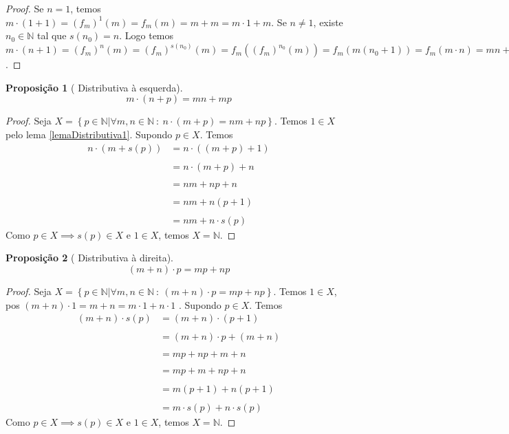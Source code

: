 \documentclass{article}
\theoremstyle{plain}
\newtheorem{prop}{Proposição}[section]
\theoremstyle{definition}
\theoremstyle{remark}
\begin{document}
\begin{proof}
	\label{lemaDistributiva1}
	Se $n = 1$, temos  $m\cdot(1+1) = (f_m)^1(m) = f_m(m) = m+m = m\cdot 1 +m$. Se $n\neq 1$, existe $n_0\in \mathbb{N}$ tal que $s(n_0) = n$. Logo temos $m\cdot( n +1) = (f_m)^{n}(m) = (f_m)^{s(n_0)}(m) =   f_m( (f_m)^{n_0} (m)) = f_m( m(n_0+1)) = f_m(m \cdot n ) =  mn+m$.
\end{proof}
\begin{prop}[ Distributiva à esquerda]
	$$m\cdot(n+p) = mn +mp$$
\end{prop}
\begin{proof}
	Seja $X = \left\{p \in \mathbb{N} | \forall m,n \in \mathbb{N} \: : \:  n\cdot(m+p) = nm + np\right\}$. Temos $1\in X$ pelo lema \ref{lemaDistributiva1}. Supondo $p\in X$. Temos \begin{align*}
		n\cdot(m+s(p)) &= n\cdot ((m+p)+1)  \\~\\
		&= n\cdot(m+p) + n\\~\\
		&= nm+np+n\\~\\
		&=nm+n(p+1)\\~\\
		&=nm+n\cdot s(p)
	\end{align*}
	Como $p\in X\implies s(p) \in X $ e $1\in X$, temos $X = \mathbb{N}$.
\end{proof}
\begin{prop}[ Distributiva à direita]
	$$(m+n)\cdot p = mp +np$$
\end{prop}
\begin{proof}
	Seja $X = \left\{p \in \mathbb{N} | \forall m,n \in \mathbb{N} \: : \:  (m+n)\cdot p = mp + np\right\}$. Temos $1\in X$, pos $(m+n)\cdot 1 = m+n = m\cdot 1 + n \cdot 1$ . Supondo $p\in X$. Temos \begin{align*}
		(m+n)\cdot s(p) &= (m+n)\cdot(p+1)  \\~\\
		&= (m+n)\cdot p + (m+n)\\~\\
		&= mp+np+m+n\\~\\
		&=mp+m+ np+n\\~\\
		&=m(p+1)+ n(p+1)\\~\\
		&=m\cdot s(p) + n\cdot s(p)
	\end{align*}
	Como $p\in X\implies s(p) \in X $ e $1\in X$, temos $X = \mathbb{N}$.
\end{proof}
\end{document}
